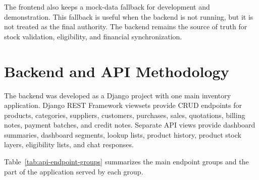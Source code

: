 The frontend also keeps a mock-data fallback for development and demonstration. This fallback is useful when the backend is not running, but it is not treated as the final authority. The backend remains the source of truth for stock validation, eligibility, and financial synchronization.

\section{Backend and API Methodology}
The backend was developed as a Django project with one main inventory application. Django REST Framework viewsets provide CRUD endpoints for products, categories, suppliers, customers, purchases, sales, quotations, billing notes, payment batches, and credit notes. Separate API views provide dashboard summaries, dashboard segments, lookup lists, product history, product stock layers, eligibility lists, and chat responses.

Table~\ref{tab:api-endpoint-groups} summarizes the main endpoint groups and the part of the application served by each group.

